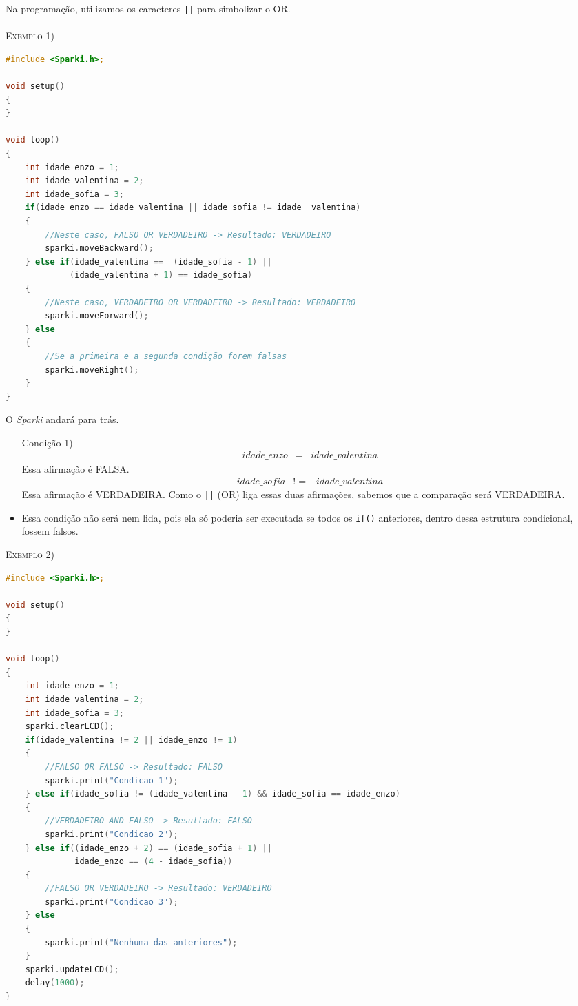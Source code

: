     Na programação, utilizamos os caracteres \lstinline[columns=fixed]{||} para simbolizar o OR.
    \\~\\
    \textsc{Exemplo 1)}
     
    \begin{lstlisting}[language=C]
#include <Sparki.h>;

void setup()
{
}

void loop()
{
    int idade_enzo = 1;
    int idade_valentina = 2;
    int idade_sofia = 3;
    if(idade_enzo == idade_valentina || idade_sofia != idade_ valentina) 
    {
        //Neste caso, FALSO OR VERDADEIRO -> Resultado: VERDADEIRO
        sparki.moveBackward();
    } else if(idade_valentina ==  (idade_sofia - 1) ||
             (idade_valentina + 1) == idade_sofia) 
    {
        //Neste caso, VERDADEIRO OR VERDADEIRO -> Resultado: VERDADEIRO
        sparki.moveForward();
    } else 
    {
        //Se a primeira e a segunda condição forem falsas
        sparki.moveRight();
    }
}
\end{lstlisting}

    
    O \textsl{Sparki} andará para trás.
    \begin{itemize}
        \item[Condição 1)] 
        \begin{eqnarray}
        idade\_enzo & = & idade\_valentina
        \end{eqnarray}
        Essa afirmação é FALSA.
        \begin{eqnarray}
        idade\_sofia & != & idade\_valentina
        \end{eqnarray}
        Essa afirmação é VERDADEIRA. Como o \lstinline[columns=fixed]{||} (OR) liga essas duas afirmações, sabemos que a comparação será VERDADEIRA.
        \item[Condição 2)] Essa condição não será nem lida, pois ela só poderia ser executada se todos os \lstinline[columns=fixed]{if()} anteriores, dentro dessa estrutura condicional, fossem falsos.
    \end{itemize}

    \textsc{Exemplo 2)}
     
    \begin{lstlisting}[language=C]
#include <Sparki.h>;

void setup()
{
}

void loop()
{
    int idade_enzo = 1;
    int idade_valentina = 2;
    int idade_sofia = 3;
    sparki.clearLCD();
    if(idade_valentina != 2 || idade_enzo != 1) 
    {
        //FALSO OR FALSO -> Resultado: FALSO
        sparki.print("Condicao 1");
    } else if(idade_sofia != (idade_valentina - 1) && idade_sofia == idade_enzo) 
    {
        //VERDADEIRO AND FALSO -> Resultado: FALSO
        sparki.print("Condicao 2");
    } else if((idade_enzo + 2) == (idade_sofia + 1) ||
              idade_enzo == (4 - idade_sofia)) 
    {
        //FALSO OR VERDADEIRO -> Resultado: VERDADEIRO
        sparki.print("Condicao 3");
    } else 
    {
        sparki.print("Nenhuma das anteriores");
    }
    sparki.updateLCD();
    delay(1000);
}
\end{lstlisting}
    
